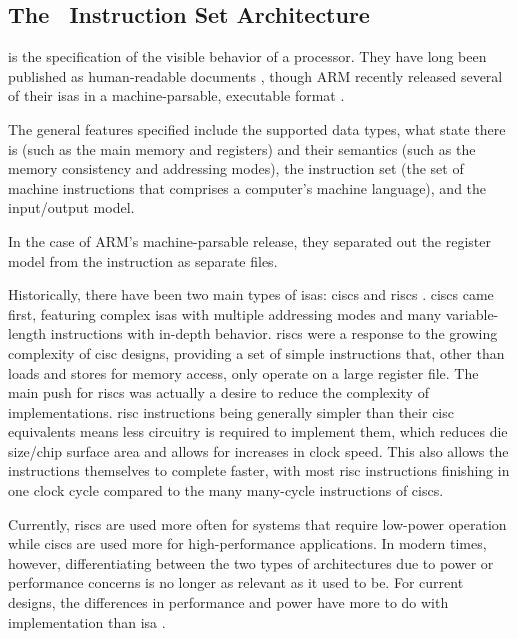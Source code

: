 \subsection{The \arch\ Instruction Set Architecture}
 is the specification of the visible behavior of a processor.
They have long been published as human-readable documents
\autocite{bowen1985cards,intel2019manual},
though ARM recently released several of their \acp{isa} in a machine-parsable,
executable format \autocite{reid2016arm}.




The general features specified include the supported data types,
what state there is (such as the main memory and registers)
and their semantics (such as the memory consistency and addressing modes), the instruction set (the set of machine instructions that comprises a computer's machine language), and the input/output model. 

In the case of ARM's machine-parsable release, they separated out the register model
from the instruction as separate files.


Historically, there have been two main types of \acp{isa}:
\acp{cisc} and \acp{risc} \autocite{jamil1995rc}.
\Acp{cisc} came first, featuring complex \acp{isa} with multiple addressing modes
and many variable-length instructions with in-depth behavior.
\Acp{risc} were a response to the growing complexity of \ac{cisc} designs,
providing a set of simple instructions that,
other than loads and stores for memory access, only operate on a large register file.
The main push for \acp{risc} was actually a desire
to reduce the complexity of implementations. \Ac{risc} instructions being
generally simpler than their \ac{cisc} equivalents
means less circuitry is required to implement them,
which reduces die size/chip surface area and allows for increases in clock speed.
This also allows the instructions themselves to complete faster,
with most \ac{risc} instructions finishing in one clock cycle
compared to the many many-cycle instructions of \acp{cisc}.

Currently, \acp{risc} are used more often for systems that require
low-power operation while \acp{cisc} are used more for high-performance applications.
In modern times, however, differentiating between the two types of architectures
due to power or performance concerns is no longer as relevant as it used to be.
For current designs, the differences in performance and power
have more to do with implementation than \ac{isa} \autocite{blem2013struggles}.

